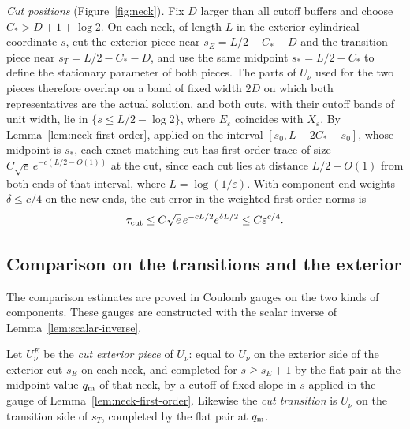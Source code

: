 \documentclass[11pt]{amsart}
\theoremstyle{definition}
\theoremstyle{remark}
\theoremstyle{plain}
\numberwithin{equation}{section}
\newcommand{\eps}{\varepsilon}
\begin{document}
\emph{Cut positions} (Figure~\ref{fig:neck})\emph{.} Fix $D$ larger than all cutoff buffers and choose
$C_*>D+1+\log2$. On each neck, of length $L$ in the exterior cylindrical
coordinate $s$, cut the exterior piece near $s_E=L/2-C_*+D$ and the
transition piece near $s_T=L/2-C_*-D$, and use the same midpoint
$s_*=L/2-C_*$ to define the stationary parameter of both pieces. The parts of $U_\nu$ used for the two pieces therefore overlap on a band of fixed width $2D$ on which
both representatives are the actual solution, and both cuts, with their cutoff bands of unit
width, lie in $\{s\le L/2-\log2\}$, where $E_\eps$ coincides with $X_\eps$. By
Lemma~\ref{lem:neck-first-order}, applied on the interval $[s_0,L-2C_*-s_0]$, whose
midpoint is $s_*$, each exact matching cut has first-order trace of size
$C\sqrt e\,e^{-c(L/2-O(1))}$ at the cut, since each cut lies at distance
$L/2-O(1)$ from both ends of that interval, where $L=\log(1/\eps)$.
With component end weights $\delta\le c/4$ on the new ends, the cut error
in the weighted first-order norms is
\begin{equation}\label{eq:cut-error}
\tau_{\rm cut}\le C\sqrt e\,e^{-cL/2}e^{\delta L/2}\le C\eps^{c/4}.
\end{equation}

\subsection{Comparison on the transitions and the exterior}\label{subsec:cut-comparison}

The comparison estimates are proved in Coulomb gauges on the two kinds of
components. These gauges are constructed with the scalar inverse of Lemma~\ref{lem:scalar-inverse}.

Let $U^E_\nu$ be the \emph{cut exterior piece} of $U_\nu$: equal to $U_\nu$ on the
exterior side of the exterior cut $s_E$ on each neck, and completed for $s\ge s_E+1$
by the flat pair at the midpoint value $q_{\rm m}$ of that neck, by a cutoff of fixed
slope in $s$ applied in the gauge of Lemma~\ref{lem:neck-first-order}. Likewise the
\emph{cut transition} is $U_\nu$ on the transition side of $s_T$, completed by the
flat pair at $q_{\rm m}$.
\end{document}
